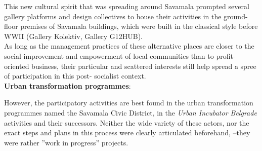 \documentclass[11pt]{report}
\begin{document}
This new cultural spirit that was spreading around Savamala prompted several gallery platforms and design collectives to house their activities in the ground-floor premises of Savamala buildings, which were built in the classical style before WWII (Gallery Kolektiv, Gallery G12HUB).
\\

As long as the management practices of these alternative places are closer to the social improvement and empowerment of local communities than to profit-oriented business, their particular and scattered interests still help spread a spree of participation in this post- socialist context.
\\	

\textbf{Urban transformation programmes}:

However, the participatory activities are best found in  the urban transformation programmes named the Savamala Civic District, in the \textit{Urban Incubator Belgrade} activities and their successors. Neither the wide variety of these actors, nor the exact steps and plans in this process were clearly articulated beforehand, --they were rather ”work in progress” projects.
\\
\end{document}
